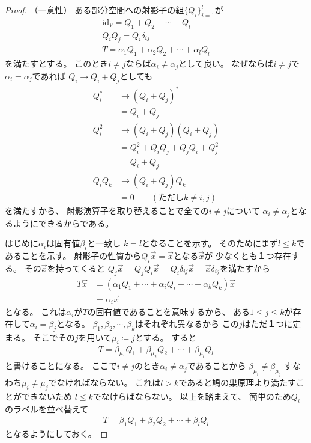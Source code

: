 \documentclass[a4paper, 10pt]{jsarticle}
\newcommand{\id}{\mathrm{id}}
\begin{document}
\begin{proof}
	\noindent （一意性）
	ある部分空間への射影子の組$\{ Q_i \}_{i=1}^l$が
	\begin{gather}
		\id_V = Q_1 + Q_2 + \cdots + Q_l \\
		Q_i Q_j = Q_i \delta_{ij} \\
		T = \alpha_1 Q_1 + \alpha_2 Q_2 + \cdots + \alpha_l Q_l
	\end{gather}
	を満たすとする。
	このとき$i \neq j$ならば$\alpha_i \neq \alpha_j$として良い。
	なぜならば$i \neq j$で$\alpha_i = \alpha_j$であれば
	$Q_i \to Q_i + Q_j$としても
	\begin{align}
		Q_i^*
		&\to \left( Q_i + Q_j \right)^* \\
		&= Q_i + Q_j \\
		Q_i^2
		&\to \left( Q_i + Q_j \right) \left( Q_i + Q_j \right) \\
		&= Q_i^2 + Q_i Q_j + Q_j Q_i + Q_j^2 \\
		&= Q_i + Q_j \\
		Q_i Q_k
		&\to \left( Q_i + Q_j \right) Q_k \\
		&= 0 \qquad \left( \text{ただし} k \neq i, j \right)
	\end{align}
	を満たすから、
	射影演算子を取り替えることで全ての$i \neq j$について
	$\alpha_i \neq \alpha_j$となるようにできるからである。

	はじめに$\alpha_i$は固有値$\beta_i$と一致し
	$k = l$となることを示す。
	そのためにまず$l \leq k$であることを示す。
	射影子の性質から$Q_i \vec{x} = \vec{x}$となる$\vec{x}$が
	少なくとも１つ存在する。
	その$\vec{x}$を持ってくると
	$Q_j \vec{x} = Q_j Q_i \vec{x}
	= Q_i \delta_{ij} \vec{x} = \vec{x} \delta_{ij}$を満たすから
	\begin{align}
		T \vec{x}
		&= \left( \alpha_1 Q_1 + \cdots + \alpha_i Q_i + \cdots
		+ \alpha_k Q_k \right) \vec{x} \\
		&= \alpha_i \vec{x}
	\end{align}
	となる。
	これは$\alpha_i$が$T$の固有値であることを意味するから、
	ある$1 \leq j \leq k$が存在して$\alpha_i = \beta_j$となる。
	$\beta_1, \beta_2, \cdots, \beta_k$はそれぞれ異なるから
	この$j$はただ１つに定まる。
	そこでその$j$を用いて$\mu_i \coloneqq j$とする。
	すると
	\begin{align}
		T = \beta_{\mu_1} Q_1 + \beta_{\mu_2} Q_2 + \cdots + \beta_{\mu_l} Q_l
	\end{align}
	と書けることになる。
	ここで$i \neq j$のとき$\alpha_i \neq \alpha_j$であることから
	$\beta_{\mu_i} \neq \beta_{\mu_j}$
	すなわち$\mu_i \neq \mu_j$でなければならない。
	これは$l > k$であると鳩の巣原理より満たすことができないため
	$l \leq k$でなけらばならない。
	以上を踏まえて、
	簡単のため$Q_i$のラベルを並べ替えて
	\begin{align}
		T = \beta_1 Q_1 + \beta_2 Q_2 + \cdots + \beta_l Q_l
	\end{align}
	となるようにしておく。


\end{proof}
\end{document}

